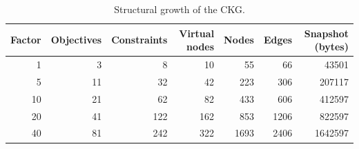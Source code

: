 \begin{table}[!t]
\centering
\caption{Structural growth of the CKG.}
\label{tab:scalability-structural}
\scriptsize
\setlength{\tabcolsep}{5pt}
\begin{tabular}{rrrrrrr}
\toprule
Factor & Objectives & Constraints & Virtual nodes & Nodes & Edges & Snapshot (bytes) \\
\midrule
1 & 3 & 8 & 10 & 55 & 66 & 43501 \\
5 & 11 & 32 & 42 & 223 & 306 & 207117 \\
10 & 21 & 62 & 82 & 433 & 606 & 412597 \\
20 & 41 & 122 & 162 & 853 & 1206 & 822597 \\
40 & 81 & 242 & 322 & 1693 & 2406 & 1642597 \\
\bottomrule
\end{tabular}
\end{table}
